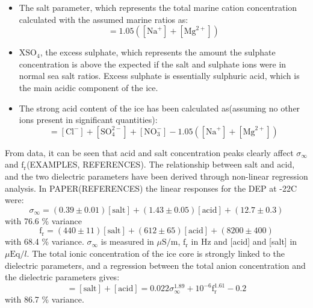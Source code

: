 \documentclass[../../CompleteThesis2/Complete_2ndDraft]{subfiles}
\begin{document}
\begin{itemize}
	\item The salt parameter, which represents the total marine cation concentration calculated with the assumed marine ratios as:
	\begin{equation}
		[\text{salt}] = 1.05 ([\text{Na}^+] + [\text{Mg}^{2+}])
	\end{equation}
	\item $\text{XSO}_4$, the excess sulphate, which represents the amount the sulphate concentration is above the expected if the salt and sulphate ions were in normal sea salt ratios. Excess sulphate is essentially sulphuric acid, which is the main acidic component of the ice.
	\item The strong acid content of the ice has been calculated as(assuming no other ions present in significant quantities):
	\begin{equation}
		[\text{acid}] = [\text{Cl}^-] + [\text{SO}_4^{2-}] + [\text{NO}_3^-] - 1.05 ([\text{Na}^+] + [\text{Mg}^{2+}])
	\end{equation}
\end{itemize}

From data, it can be seen that acid and salt concentration peaks clearly affect $\sigma_{\infty}$ and $\text{f}_{\text{r}}$(EXAMPLES, REFERENCES). The relationship between salt and acid, and the two dielectric parameters have been derived through non-linear regression analysis. In PAPER(REFERENCES) the linear responses for the DEP at -22\degree C were:
\begin{equation}
	\sigma_{\infty} = (0.39\pm 0.01)[\text{salt}] + (1.43\pm 0.05)[\text{acid}] + (12.7\pm 0.3)
\end{equation}
with 76.6 \% variance
\begin{equation}
	\text{f}_{\text{r}} = (440\pm 11)[\text{salt}] + (612\pm 65)[\text{acid}] + (8200\pm 400)
\end{equation}
with 68.4 \% variance. $\sigma_{\infty}$ is measured in $\mu\text{S}/\text{m}$, $\text{f}_{\text{r}}$ in Hz and [acid] and [salt] in $\mu\text{Eq}/l$.
The total ionic concentration of the ice core is strongly linked to the dielectric parameters, and a regression between the total anion concentration and the dielectric parameters gives:
\begin{equation}
	[\text{anions}] = [\text{salt}] + [\text{acid}] = 0.022\sigma_{\infty}^{1.89} + 10^{-6}\text{f}_{\text{r}}^{1.61} - 0.2
\end{equation}
with 86.7 \% variance.
\end{document}
